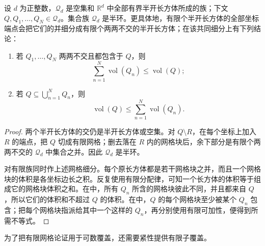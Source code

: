 \begin{lemma}
\label{b1:lem:rectangle-grid}
设 \(d\) 为正整数，\(\mathscr Q_d\) 是空集和 \(\mathbb R^d\) 中全部有界半开长方体所成的族；下文 \(Q,Q_1,\ldots,Q_N\in\mathscr Q_d\)。集合族 \(\mathscr Q_d\) 是半环。更具体地，有限个半开长方体的全部坐标端点会把它们的并细分成有限个两两不交的半开长方体；在该共同细分上有下列结论：
\begin{enumerate}
  \item \label{b1:item:0301-grid-1}若 \(Q_1,\ldots,Q_N\) 两两不交且都包含于 \(Q\)，则
  \[
  \sum_{n=1}^{N}\operatorname{vol}(Q_n)\leq\operatorname{vol}(Q);
  \]
  \item \label{b1:item:0301-grid-2}若 \(Q\subseteq\bigcup_{n=1}^{N}Q_n\)，则
  \[
  \operatorname{vol}(Q)\leq\sum_{n=1}^{N}\operatorname{vol}(Q_n).
  \]
\end{enumerate}
\end{lemma}
\begin{proof}
两个半开长方体的交仍是半开长方体或空集。对 \(Q\setminus R\)，在每个坐标上加入 \(R\) 的端点，把 \(Q\) 切成有限网格；删去落在 \(R\) 内的网格块后，余下部分是有限个两两不交的 \(\mathscr Q_d\) 中集合之并。因此 \(\mathscr Q_d\) 是半环。

对有限族同时作上述网格细分。每个原长方体都是若干网格块之并，而且一个网格块的体积是各坐标边长之积。反复使用有限分配律，可知一个长方体的体积等于组成它的网格块体积之和。在中，所有 \(Q_n\) 所含的网格块彼此不同，并且都来自 \(Q\)，所以它们的体积和不超过 \(Q\) 的体积。在中，\(Q\) 的每个网格块至少被某个 \(Q_n\) 包含；把每个网格块指派给其中一个这样的 \(Q_n\)，再分别使用有限可加性，便得到所需不等式。
\end{proof}

为了把有限网格论证用于可数覆盖，还需要紧性提供有限子覆盖。


